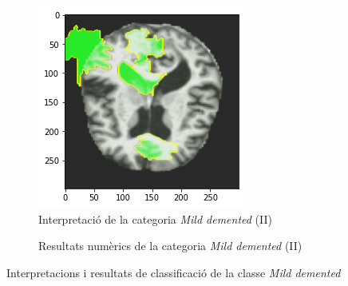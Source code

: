 \documentclass[a4paper,12pt]{article}
\begin{document}
\begin{figure}[h!]
\begin{subfigure}[b]{0.40\linewidth}
    \end{subfigure}
    \begin{subfigure}[b]{0.40\linewidth}
        \includegraphics[width=\linewidth]{images/Mild 2.png}
        \caption{Interpretació de la categoria \textit{Mild demented} (II)}
        \label{fig:MD2}
    \end{subfigure}
    \begin{subfigure}[b]{0.40\linewidth}
        \caption{Resultats numèrics de la categoria \textit{Mild demented} (II)}
        \label{fig:ClassificacioMD1}
    \end{subfigure}
    \caption{Interpretacions i resultats de classificació de la classe \textit{Mild demented}}
    \label{fig:MDInterpretacions}
\end{figure}
\end{document}
